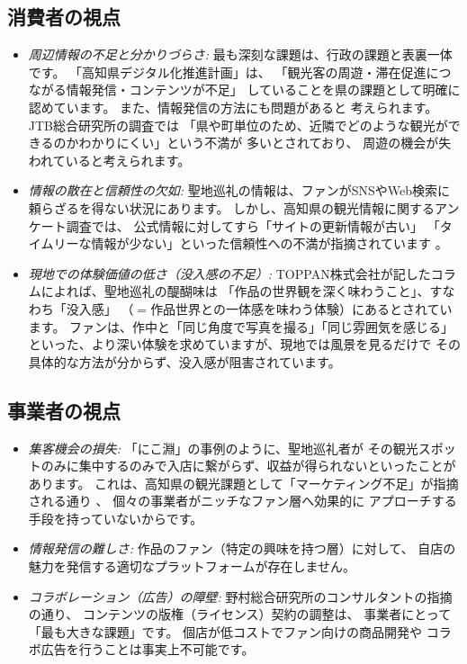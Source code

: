 \documentclass{docs}
\begin{document}
\subsection{消費者の視点}
\begin{itemize}
	\item \emph{周辺情報の不足と分かりづらさ:}
	最も深刻な課題は、行政の課題\cite{kochi_dx_plan}と表裏一体です。
	「高知県デジタル化推進計画」\cite{kochi_dx_plan}は、
	「観光客の周遊・滞在促進につながる情報発信・コンテンツが不足」
	していることを県の課題として明確に認めています。
	また、情報発信の方法にも問題があると
	考えられます。JTB総合研究所の調査\cite{jtb_trc_2017}では
	「県や町単位のため、近隣でどのような観光ができるのかわかりにくい」という不満が
	多いとされており、
	周遊の機会が失われていると考えられます。

	\item \emph{情報の散在と信頼性の欠如:}
	聖地巡礼の情報は、ファンがSNSやWeb検索に頼らざるを得ない状況にあります。
	しかし、高知県の観光情報に関するアンケート調査では、
	公式情報に対してすら「サイトの更新情報が古い」
	「タイムリーな情報が少ない」といった信頼性への不満が指摘されています
	\cite{kochi_tech_2017}。

	\item \emph{現地での体験価値の低さ（没入感の不足）:}
	TOPPAN株式会社が記したコラム\cite{toppan2025}によれば、聖地巡礼の醍醐味は
	「作品の世界観を深く味わうこと」、すなわち「没入感」
	（$={}$作品世界との一体感を味わう体験）にあるとされています。
	ファンは、作中と「同じ角度で写真を撮る」「同じ雰囲気を感じる」
	といった、より深い体験を求めていますが、現地では風景を見るだけで
	その具体的な方法が分からず、没入感が阻害されています。
\end{itemize}


\subsection{事業者の視点}
\begin{itemize}
\item \emph{集客機会の損失:}
	「にこ淵」の事例\cite{nikobuchi_mlit}のように、聖地巡礼者が
	その観光スポットのみに集中するのみで入店に繋がらず、収益が得られないといったことがあります。
	これは、高知県の観光課題として「マーケティング不足」が指摘される通り
	\cite{kochi_tech_2017}、
	個々の事業者がニッチなファン層へ効果的に
	アプローチする手段を持っていないからです。

	\item \emph{情報発信の難しさ:}
	作品のファン（特定の興味を持つ層）に対して、
	自店の魅力を発信する適切なプラットフォームが存在しません。

	\item \emph{コラボレーション（広告）の障壁:}
	野村総合研究所のコンサルタントの指摘\cite{nri2024}の通り、
	コンテンツの版権（ライセンス）契約の調整は、
	事業者にとって「最も大きな課題」です。
	個店が低コストでファン向けの商品開発や
	コラボ広告を行うことは事実上不可能です。
\end{itemize}
\end{document}
